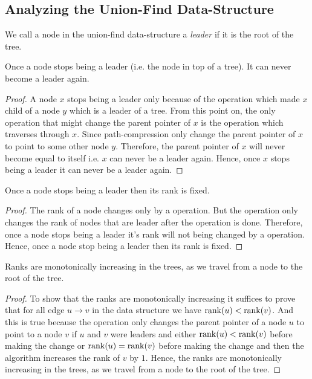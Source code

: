 \subsection{Analyzing the Union-Find Data-Structure}\label{analysis-union-find}
We call a node in the union-find data-structure a \emph{leader} if it is the root of the tree.
\begin{lemma}{}{}
	Once a node stops being a {leader} (i.e. the node in top of a tree). It can never become a leader again.
\end{lemma}
\begin{proof}
	A node $x$ stops being a {leader} only because of the  operation which made $x$ child of a node $y$ which is a {leader} of a tree. From this point on, the only operation that might change the parent pointer of $x$ is the  operation which traverses through $x$. Since path-compression only change the parent pointer of $x$ to point to some other node $y$. Therefore, the parent pointer of $x$ will never become equal to itself i.e. $x$ can never be a {leader} again. Hence, once $x$ stops being a {leader} it can never be a {leader} again.
\end{proof}
\begin{lemma}{}{}
	Once a node stops being a leader then its rank is fixed.
\end{lemma}
\begin{proof}
	The rank of a node changes only by a  operation. But the  operation only changes the rank of nodes that are {leader} after the operation is done. Therefore, once a node stops being a {leader} it's rank will not being changed by a  operation. Hence, once a node stop being a leader then its rank is fixed.
\end{proof}
\begin{lemma}{}{}
	Ranks are monotonically increasing in the trees, as we travel from a node to the root of the tree.
\end{lemma}
\begin{proof}
	To show that the ranks are monotonically increasing  it suffices to prove that for all edge $u\to v$ in the data structure we have $\operatorname{rank}(u)<\operatorname{rank}(v)$. And this is true because the  operation only changes the parent pointer of a node $u$ to point to a node $v$ if $u$ and $v$ were leaders and either $\operatorname{rank}(u)<\operatorname{rank}(v)$ before making the change or $\operatorname{rank}(u)=\operatorname{rank}(v)$ before making the change and then the algorithm increases the rank of $v$ by $1$. Hence, the ranks are monotonically increasing in the trees, as we travel from a node to the root of the tree.
\end{proof}

